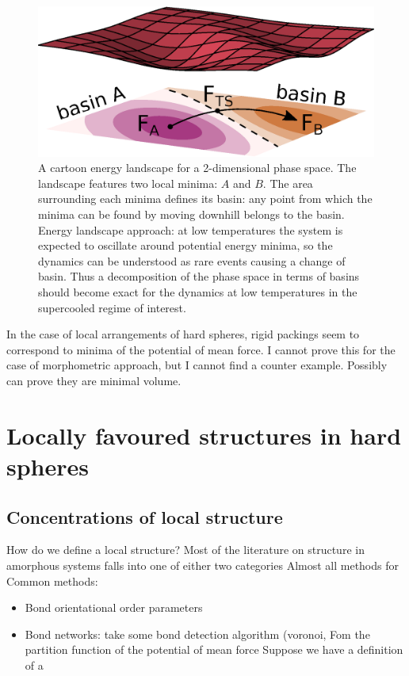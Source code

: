 \documentclass[11pt,twoside]{report}
\begin{document}
\begin{figure}
  \includegraphics[width=\linewidth,outer]{toy-landscape}
  \caption[A cartoon energy landscape]{A cartoon energy landscape for a 2-dimensional phase space.
    The landscape features two local minima: $A$ and $B$.
    The area surrounding each minima defines its basin: any point from which the minima can be found by moving downhill belongs to the basin.
    Energy landscape approach: at low temperatures the system is expected to oscillate around potential energy minima, so the dynamics can be understood as rare events causing a change of basin.
    Thus a decomposition of the phase space in terms of basins should become exact for the dynamics at low temperatures in the supercooled regime of interest.}
\end{figure}

In the case of local arrangements of hard spheres, rigid packings seem to correspond to minima of the potential of mean force.
I cannot prove this for the case of morphometric approach, but I cannot find a counter example.
Possibly can prove they are minimal volume.

\section{Locally favoured structures in hard spheres}

\subsection{Concentrations of local structure}

How do we define a local structure?
Most of the literature on structure in amorphous systems falls into one of either two categories
Almost all methods for Common methods:
\begin{itemize}
  \item Bond orientational order parameters
  \item Bond networks: take some bond detection algorithm (voronoi, 
Fom the partition function of the potential of mean force
Suppose we have a definition of a
\end{itemize}
\end{document}

